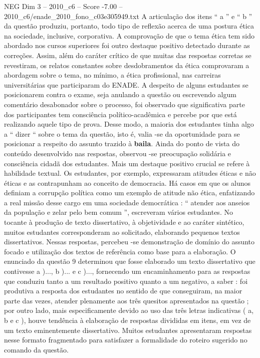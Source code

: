\begin{textsample}{NEG Dim 3 – 2010\_c6 – Score -7.00 – 2010\_c6/enade\_2010\_fono\_c03e305949.txt}
A articulação dos itens “ a ” e “ b ” da questão produziu, portanto, todo tipo de reflexão acerca de uma postura ética na sociedade, inclusive, corporativa.
A comprovação de que o tema ética tem sido abordado nos cursos superiores foi outro destaque positivo detectado durante as correções.
Assim, além do caráter crítico de que muitas das respostas corretas se revestiram, os relatos constantes sobre desdobramentos da ética comprovaram a abordagem sobre o tema, no mínimo, a ética profissional, nas carreiras universitárias que participaram do ENADE.
A despeito de alguns estudantes se posicionarem contra o exame, seja anulando a questão ou escrevendo algum comentário desabonador sobre o processo, foi observado que significativa parte dos participantes tem consciência político-acadêmica e percebe por que está realizando aquele tipo de prova.
Desse modo, a maioria dos estudantes tinha algo a “ dizer “ sobre o tema da questão, isto é, valia -se da oportunidade para se posicionar a respeito do assunto trazido à \textbf{baila}.
Ainda do ponto de vista do conteúdo desenvolvido nas respostas, observou -se preocupação solidária e consciência cidadã dos estudantes.
Mais um destaque positivo crucial se refere à habilidade textual.
Os estudantes, por exemplo, expressaram atitudes éticas e não éticas e as contrapunham ao conceito de democracia.
Há casos em que os alunos definiam a corrupção política como um exemplo de atitude não ética, enfatizando a real missão desse cargo em uma sociedade democrática : “ atender aos anseios da população e zelar pelo bem comum ”, escreveram vários estudantes.
No tocante à produção de texto dissertativo, à objetividade e ao caráter sintético, muitos estudantes corresponderam ao solicitado, elaborando pequenos textos dissertativos.
Nessas respostas, percebeu -se demonstração de domínio do assunto focado e utilização dos textos de referência como base para a elaboração.
O enunciado da questão 9 determinou que fosse elaborado um texto dissertativo que contivesse a )..., b )... e c )..., fornecendo um encaminhamento para as respostas que conduziu tanto a um resultado positivo quanto a um negativo, a saber : foi produtiva a resposta dos estudantes no sentido de que conseguiram, na maior parte das vezes, atender plenamente aos três quesitos apresentados na questão ; por outro lado, mais especificamente devido ao uso das três letras indicativas ( a, b e c ), houve tendência à elaboração de respostas divididas em itens, em vez de um texto eminentemente dissertativo.
Muitos estudantes apresentaram respostas nesse formato fragmentado para satisfazer a formalidade do roteiro sugerido no comando da questão.

\end{textsample}
